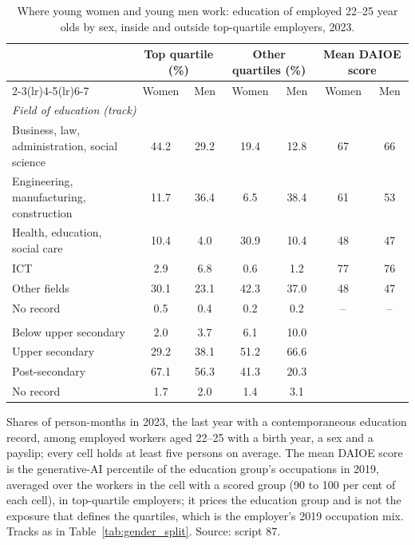 \begin{table}[ht!]
\centering
\caption{Where young women and young men work: education of employed 22--25 year olds by sex, inside and outside top-quartile employers, 2023.}
\label{tab:education_mix}
\footnotesize
\setlength{\tabcolsep}{3.5pt}
\begin{tabular}{lcccccc}
\toprule
 & \multicolumn{2}{c}{Top quartile (\%)} & \multicolumn{2}{c}{Other quartiles (\%)} & \multicolumn{2}{c}{Mean DAIOE score} \\
\cmidrule(lr){2-3}\cmidrule(lr){4-5}\cmidrule(lr){6-7}
 & Women & Men & Women & Men & Women & Men \\
\midrule
\multicolumn{7}{l}{\textit{Field of education (track)}} \\
Business, law, administration, social science & 44.2 & 29.2 & 19.4 & 12.8 & 67 & 66 \\
Engineering, manufacturing, construction & 11.7 & 36.4 & 6.5 & 38.4 & 61 & 53 \\
Health, education, social care & 10.4 & 4.0 & 30.9 & 10.4 & 48 & 47 \\
ICT & 2.9 & 6.8 & 0.6 & 1.2 & 77 & 76 \\
Other fields & 30.1 & 23.1 & 42.3 & 37.0 & 48 & 47 \\
No record & 0.5 & 0.4 & 0.2 & 0.2 & -- & -- \\
\addlinespace[3pt]
\multicolumn{7}{l}{\textit{Level of education}} \\
Below upper secondary & 2.0 & 3.7 & 6.1 & 10.0 & & \\
Upper secondary & 29.2 & 38.1 & 51.2 & 66.6 & & \\
Post-secondary & 67.1 & 56.3 & 41.3 & 20.3 & & \\
No record & 1.7 & 2.0 & 1.4 & 3.1 & & \\
\bottomrule
\end{tabular}
\begin{minipage}{0.94\textwidth}\footnotesize\vspace{4pt}
Shares of person-months in 2023, the last year with a contemporaneous education record, among employed workers aged 22--25 with a birth year, a sex and a payslip; every cell holds at least five persons on average. The mean DAIOE score is the generative-AI percentile of the education group's occupations in 2019, averaged over the workers in the cell with a scored group (90 to 100 per cent of each cell), in top-quartile employers; it prices the education group and is not the exposure that defines the quartiles, which is the employer's 2019 occupation mix. Tracks as in Table~\ref{tab:gender_split}. Source: script 87.
\end{minipage}
\end{table}
